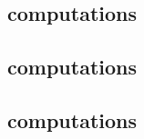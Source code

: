 \subsection{\macroSystemTxnNoop{}          computations} \label{system transactions: computations: noop}     
\subsection{\macroSystemTxnEipBeaconRoot{} computations} \label{system transactions: computations: eip-4788} 
\subsection{\macroSystemTxnEipBlockHash{}  computations} \label{system transactions: computations: eip-2935} 
